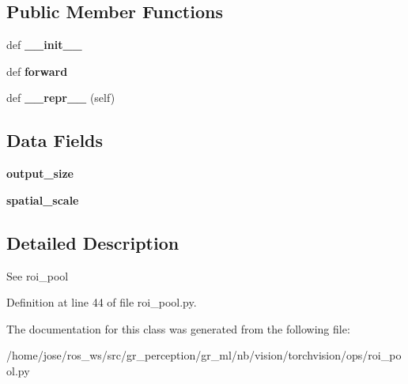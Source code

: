 \subsection*{Public Member Functions}
\begin{DoxyCompactItemize}
\item 
\mbox{\label{classtorchvision_1_1ops_1_1roi__pool_1_1RoIPool_afcae533dc98de2975632e79167c852e5}} 
def {\bfseries \+\_\+\+\_\+init\+\_\+\+\_\+}
\item 
\mbox{\label{classtorchvision_1_1ops_1_1roi__pool_1_1RoIPool_add33b44a80935e800e9e15bf308c2681}} 
def {\bfseries forward}
\item 
\mbox{\label{classtorchvision_1_1ops_1_1roi__pool_1_1RoIPool_a56bfee9b63ace214798c70e789a22649}} 
def {\bfseries \+\_\+\+\_\+repr\+\_\+\+\_\+} (self)
\end{DoxyCompactItemize}
\subsection*{Data Fields}
\begin{DoxyCompactItemize}
\item 
\mbox{\label{classtorchvision_1_1ops_1_1roi__pool_1_1RoIPool_a77e6892dd2413e124427354ed9abe680}} 
{\bfseries output\+\_\+size}
\item 
\mbox{\label{classtorchvision_1_1ops_1_1roi__pool_1_1RoIPool_acca35264aacf3b256d783f8759d048a9}} 
{\bfseries spatial\+\_\+scale}
\end{DoxyCompactItemize}


\subsection{Detailed Description}
\begin{DoxyVerb}See roi_pool
\end{DoxyVerb}
 

Definition at line 44 of file roi\+\_\+pool.\+py.



The documentation for this class was generated from the following file\+:\begin{DoxyCompactItemize}
\item 
/home/jose/ros\+\_\+ws/src/gr\+\_\+perception/gr\+\_\+ml/nb/vision/torchvision/ops/roi\+\_\+pool.\+py\end{DoxyCompactItemize}
